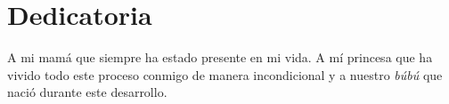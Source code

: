 \chapter*{Dedicatoria}

A mi mam\'a que siempre ha estado presente en mi vida. A m\'i princesa que ha vivido todo este proceso conmigo de manera incondicional y a nuestro \textit{b\'ub\'u} que naci\'o durante este desarrollo.

